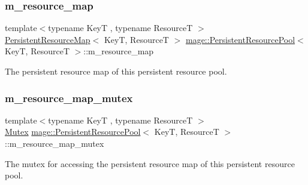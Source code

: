 \subsubsection{\texorpdfstring{m\+\_\+resource\+\_\+map}{m\_resource\_map}}
{\footnotesize\ttfamily template$<$typename KeyT , typename ResourceT $>$ \\
\hyperlink{namespacemage_a1eb49644c6b3b6a72fa342a7c1f54aed}{Persistent\+Resource\+Map}$<$ KeyT, ResourceT $>$ \hyperlink{classmage_1_1_persistent_resource_pool}{mage\+::\+Persistent\+Resource\+Pool}$<$ KeyT, ResourceT $>$\+::m\+\_\+resource\+\_\+map\hspace{0.3cm}{\ttfamily [private]}}

The persistent resource map of this persistent resource pool. \hypertarget{classmage_1_1_persistent_resource_pool_acd393008aa9fcebf06daa5ba2b8cc073}{}\label{classmage_1_1_persistent_resource_pool_acd393008aa9fcebf06daa5ba2b8cc073} 
\subsubsection{\texorpdfstring{m\+\_\+resource\+\_\+map\+\_\+mutex}{m\_resource\_map\_mutex}}
{\footnotesize\ttfamily template$<$typename KeyT , typename ResourceT $>$ \\
\hyperlink{structmage_1_1_mutex}{Mutex} \hyperlink{classmage_1_1_persistent_resource_pool}{mage\+::\+Persistent\+Resource\+Pool}$<$ KeyT, ResourceT $>$\+::m\+\_\+resource\+\_\+map\+\_\+mutex\hspace{0.3cm}{\ttfamily [private]}}

The mutex for accessing the persistent resource map of this persistent resource pool. 